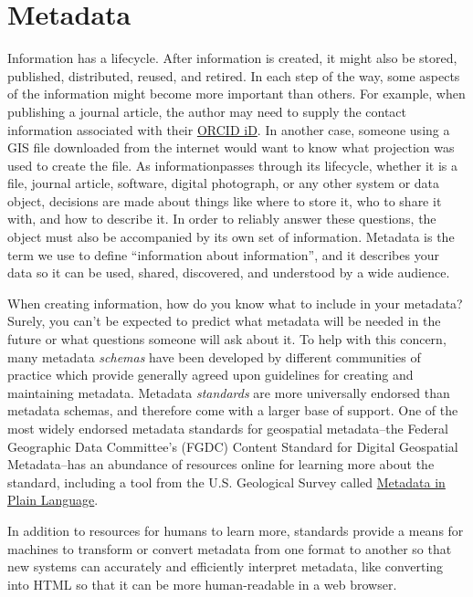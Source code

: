 \documentclass[
]{book}
\begin{document}
\hypertarget{metadata}{%
\section{Metadata}\label{metadata}}

Information has a lifecycle. After information is created, it might also be stored, published, distributed, reused, and retired. In each step of the way, some aspects of the information might become more important than others. For example, when publishing a journal article, the author may need to supply the contact information associated with their \href{https://orcid.org/}{ORCID iD}. In another case, someone using a GIS file downloaded from the internet would want to know what projection was used to create the file. As informationpasses through its lifecycle, whether it is a file, journal article, software, digital photograph, or any other system or data object, decisions are made about things like where to store it, who to share it with, and how to describe it. In order to reliably answer these questions, the object must also be accompanied by its own set of information. Metadata is the term we use to define ``information about information'', and it describes your data so it can be used, shared, discovered, and understood by a wide audience.

When creating information, how do you know what to include in your metadata? Surely, you can't be expected to predict what metadata will be needed in the future or what questions someone will ask about it. To help with this concern, many metadata \emph{schemas} have been developed by different communities of practice which provide generally agreed upon guidelines for creating and maintaining metadata. Metadata \emph{standards} are more universally endorsed than metadata schemas, and therefore come with a larger base of support. One of the most widely endorsed metadata standards for geospatial metadata--the Federal Geographic Data Committee's (FGDC) Content Standard for Digital Geospatial Metadata--has an abundance of resources online for learning more about the standard, including a tool from the U.S. Geological Survey called \href{https://geology.usgs.gov/tools/metadata/tools/doc/ctc/}{Metadata in Plain Language}.

In addition to resources for humans to learn more, standards provide a means for machines to transform or convert metadata from one format to another so that new systems can accurately and efficiently interpret metadata, like converting into HTML so that it can be more human-readable in a web browser.
\end{document}
